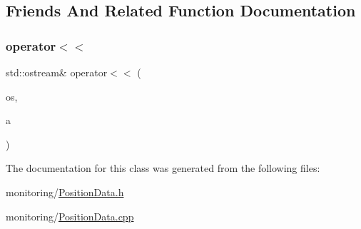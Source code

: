 \subsection{Friends And Related Function Documentation}
\mbox{\label{class_position_data_a67be412af90b9acf2067c5a7c8904462}} 
\subsubsection{\texorpdfstring{operator$<$$<$}{operator<<}}
{\footnotesize\ttfamily std\+::ostream\& operator$<$$<$ (\begin{DoxyParamCaption}\item[{std\+::ostream \&}]{os,  }\item[{const \hyperlink{class_position_data}{Position\+Data} \&}]{a }\end{DoxyParamCaption})\hspace{0.3cm}{\ttfamily [friend]}}



The documentation for this class was generated from the following files\+:\begin{DoxyCompactItemize}
\item 
monitoring/\hyperlink{_position_data_8h}{Position\+Data.\+h}\item 
monitoring/\hyperlink{_position_data_8cpp}{Position\+Data.\+cpp}\end{DoxyCompactItemize}
